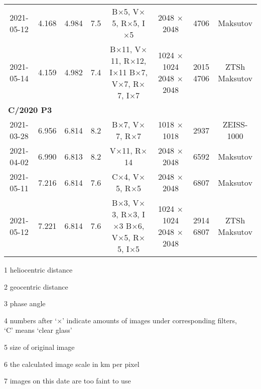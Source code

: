 \begin{table}
\begin{threeparttable}
{\begin{tabular}{cccccccc}
            2021-05-12 & \num{4.168} & \num{4.984} & \num{7.5} & B$\times$5, V$\times$5, R$\times$5, I$\times$5 & 2048 $\times$ 2048 & 4706 & Maksutov \\
            2021-05-14 & \num{4.159} & \num{4.982} & \num{7.4} & \makecell[c]{B$\times$11, V$\times$11, R$\times$12, I$\times$11 \\ B$\times$7, V$\times$7, R$\times$7, I$\times$7} & \makecell[c]{1024 $\times$ 1024 \\ 2048 $\times$ 2048}  & \makecell[c]{2015 \\ 4706} & \makecell[c]{ZTSh \\ Maksutov} \\

            \multicolumn{8}{l}{\textbf{C/2020 P3}} \\
            2021-03-28\tnote{7} & \num{6.956} & \num{6.814} & \num{8.2} & B$\times$7, V$\times$7, R$\times$7 & 1018 $\times$ 1018 & 2937 & ZEISS-1000 \\
            2021-04-02 & \num{6.990} & \num{6.813} & \num{8.2} & V$\times$11, R$\times$14 & 2048 $\times$ 2048 & 6592 & Maksutov \\
            2021-05-11 & \num{7.216} & \num{6.814} & \num{7.6} & C$\times$4, V$\times$5, R$\times$5 & 2048 $\times$ 2048 & 6807 & Maksutov \\
            2021-05-12 & \num{7.221} & \num{6.814} & \num{7.6} & \makecell[c]{B$\times$3, V$\times$3, R$\times$3, I$\times$3 \\ B$\times$6, V$\times$5, R$\times$5, I$\times$5} & \makecell[c]{1024 $\times$ 1024 \\ 2048 $\times$ 2048}  & \makecell[c]{2914 \\ 6807} & \makecell[c]{ZTSh \\ Maksutov} \\
            \bottomrule
        \end{tabular}
        }
        \begin{tablenotes}
            \item[1] heliocentric distance
            \item[2] geocentric distance
            \item[3] phase angle
            \item[4] numbers after `$\times$' indicate amounts of images under corresponding filters, \\
            `C' means `clear glass'
            \item[5] size of original image
            \item[6] the calculated image scale in \si{\km} per pixel
            \item[7] images on this date are too faint to use
        \end{tablenotes}
    \end{threeparttable}
\end{table}

